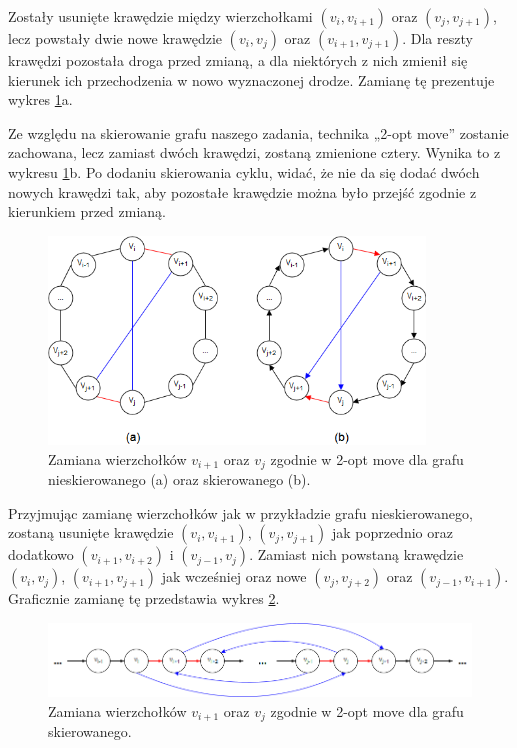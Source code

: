 \documentclass[11pt,a4paper,twoside]{article}
\begin{document}
Zostały usunięte krawędzie między wierzchołkami $(v_{i}, v_{i+1})$ oraz $(v_{j}, v_{j+1})$, lecz powstały dwie nowe krawędzie $(v_{i}, v_{j})$ oraz $(v_{i+1}, v_{j+1})$. Dla reszty krawędzi pozostała droga przed zmianą, a dla niektórych z nich zmienił się kierunek ich przechodzenia w nowo wyznaczonej drodze. Zamianę tę prezentuje wykres \ref{2opt4krawedzie}a.

Ze względu na skierowanie grafu naszego zadania, technika „2-opt move” zostanie zachowana, lecz zamiast dwóch krawędzi, zostaną zmienione cztery. Wynika to z wykresu \ref{2opt4krawedzie}b. Po dodaniu skierowania cyklu, widać, że nie da się dodać dwóch nowych krawędzi tak, aby pozostałe krawędzie można było przejść zgodnie z kierunkiem przed zmianą.

\begin{figure}[ht]
\vspace{-0pt}
\centering
\includegraphics[width=10cm]{2opt4krawedzie}
\caption{Zamiana wierzchołków $v_{i+1}$ oraz $v_{j}$ zgodnie w 2-opt move dla grafu nieskierowanego (a) oraz skierowanego (b).}
\label{2opt4krawedzie}
\end{figure}



Przyjmując zamianę wierzchołków jak w przykładzie grafu nieskierowanego, zostaną usunięte krawędzie $(v_{i}, v_{i+1})$, $(v_{j}, v_{j+1})$ jak poprzednio oraz dodatkowo $(v_{i+1}, v_{i+2})$ i $(v_{j-1}, v_{j})$. Zamiast nich powstaną krawędzie $(v_{i}, v_{j})$, $(v_{i+1}, v_{j+1})$ jak wcześniej oraz nowe $(v_{j}, v_{j+2})$ oraz $(v_{j-1}, v_{i+1})$. Graficznie zamianę tę przedstawia wykres \ref{2optMove}.

\begin{figure}[ht]
\vspace{-0pt}
\centering
\includegraphics[width=15cm]{2optMove}
\caption{Zamiana wierzchołków $v_{i+1}$ oraz $v_{j}$ zgodnie w 2-opt move dla grafu skierowanego.}
\label{2optMove}
\end{figure}
\end{document}
